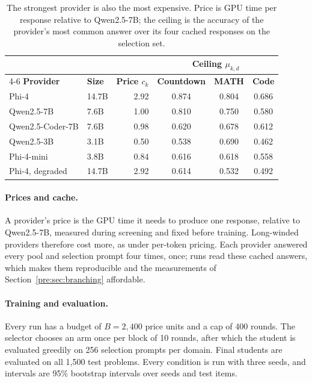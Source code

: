 \begin{table}[htbp]
\centering
\small
\begin{tabular}{@{}llrccc@{}}
\toprule
 & & & \multicolumn{3}{c}{\textbf{Ceiling $\mu_{k,d}$}} \\
\cmidrule(l){4-6}
\textbf{Provider} & \textbf{Size} & \textbf{Price $c_k$} & \textbf{Countdown} &
  \textbf{MATH} & \textbf{Code} \\
\midrule
Phi-4 \autocite{abdin_phi4_2024}                 & 14.7B & 2.92 & 0.874 & 0.804 & 0.686 \\
Qwen2.5-7B \autocite{qwen_qwen25_2024}           & 7.6B  & 1.00 & 0.810 & 0.750 & 0.580 \\
Qwen2.5-Coder-7B \autocite{hui_qwen25coder_2024} & 7.6B  & 0.98 & 0.620 & 0.678 & 0.612 \\
Qwen2.5-3B \autocite{qwen_qwen25_2024}           & 3.1B  & 0.50 & 0.538 & 0.690 & 0.462 \\
Phi-4-mini \autocite{microsoft_phi4mini_2025}    & 3.8B  & 0.84 & 0.616 & 0.618 & 0.558 \\
Phi-4, degraded                                  & 14.7B & 2.92 & 0.614 & 0.532 & 0.492 \\
\bottomrule
\end{tabular}
\caption{The strongest provider is also the most expensive. Price is GPU time per response
relative to Qwen2.5-7B; the ceiling is the accuracy of the provider's most common answer
over its four cached responses on the selection set.}
\label{pre:tab:pool}
\end{table}

\paragraph{Prices and cache.} A provider's price is the GPU time it needs to produce one
response, relative to Qwen2.5-7B, measured during screening and fixed before training.
Long-winded providers therefore cost more, as under per-token pricing. Each provider
answered every pool and selection prompt four times, once; runs read these cached answers,
which makes them reproducible and the measurements of Section~\ref{pre:sec:branching}
affordable.

\paragraph{Training and evaluation.} Every run has a budget of $B = 2{,}400$ price units
and a cap of 400 rounds. The selector chooses an arm once per block of 10 rounds, after
which the student is evaluated greedily on 256 selection prompts per domain. Final students
are evaluated on all 1,500 test problems. Every condition is run with three seeds, and
intervals are 95\% bootstrap intervals over seeds and test items.

